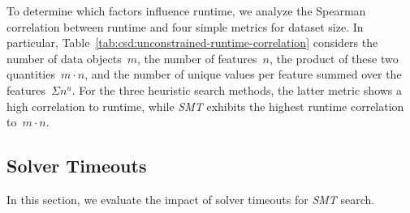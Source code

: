 \documentclass{article}
\theoremstyle{definition}
\begin{document}
To determine which factors influence runtime, we analyze the Spearman correlation between runtime and four simple metrics for dataset size.
In particular, Table~\ref{tab:csd:unconstrained-runtime-correlation} considers the number of data objects~$m$, the number of features~$n$, the product of these two quantities~$m \cdot n$, and the number of unique values per feature summed over the features~$\Sigma n^u$.
For the three heuristic search methods, the latter metric shows a high correlation to runtime, while \emph{SMT} exhibits the highest runtime correlation to~$m \cdot n$.

\subsection{Solver Timeouts}
\label{sec:csd:evaluation:timeouts}

In this section, we evaluate the impact of solver timeouts for \emph{SMT} search.
\end{document}
